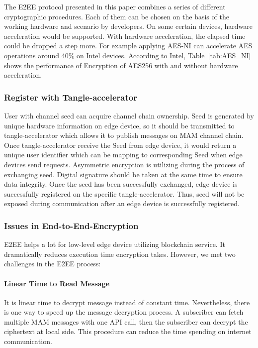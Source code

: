 \documentclass[conference]{IEEEtran}
\begin{document}
The E2EE protocol presented in this paper combines a series of different cryptographic procedures. Each of them can be chosen on the basis of the working hardware and scenario by developers. On some certain devices, hardware acceleration would be supported. With hardware acceleration, the elapsed time could be dropped a step more. For example applying AES-NI can accelerate AES operations around 40\% on Intel devices.\cite{AES-NI-Acceleration} According to Intel, Table~\ref{tab:AES_NI} shows the performance of Encryption of AES256 with and without hardware acceleration.

\subsubsection{Register with Tangle-accelerator}
User with channel seed can acquire channel chain ownership. Seed is generated by unique hardware information on edge device, so it should be transmitted to tangle-accelerator which allows it to publish messages on MAM channel chain. Once tangle-accelerator receive the Seed from edge device, it would return a unique user identifier which can be mapping to corresponding Seed when edge devices send requests. Asymmetric encryption is utilizing during the process of exchanging seed. Digital signature should be taken at the same time to ensure data integrity. Once the seed has been successfully exchanged, edge device is successfully registered on the specific tangle-accelerator. Thus, seed will not be exposed during communication after an edge device is successfully registered.

\subsubsection{Issues in End-to-End-Encryption}
E2EE helps a lot for low-level edge device utilizing blockchain service. It dramatically reduces execution time encryption takes. However, we met two challenges in the E2EE process:

\paragraph{Linear Time to Read Message}
It is linear time to decrypt message instead of constant time. Nevertheless, there is one way to speed up the message decryption process. A subscriber can fetch multiple MAM messages with one API call, then the subscriber can decrypt the ciphertext at local side. This procedure can reduce the time spending on internet communication.
\end{document}
